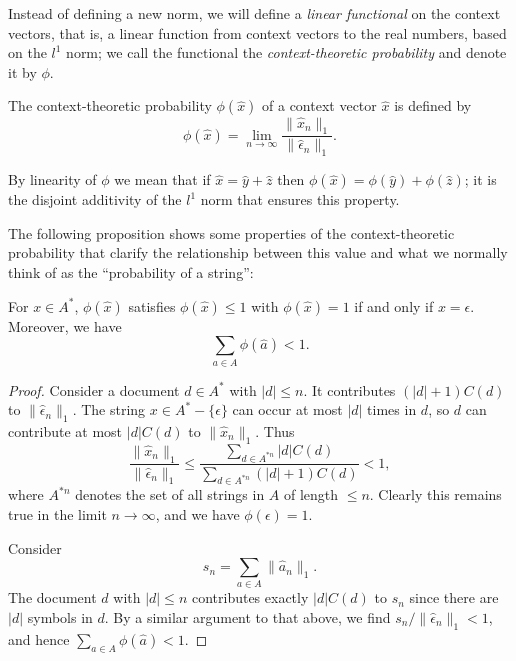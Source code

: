 \documentclass[11pt]{report}
\begin{document}
Instead of defining a new norm, we will define a \emph{linear functional} on the context vectors, that is, a linear function from context vectors to the real numbers, based on the $l^1$ norm; we call the functional the \emph{context-theoretic probability} and denote it by $\phi$.

\begin{defn}
The context-theoretic probability $\phi(\hat{x})$ of a context vector $\hat{x}$ is defined by 
$$\phi(\hat{x}) = \lim_{n\rightarrow\infty} \frac{\|\hat{x}_n\|_1}{\|\hat{\epsilon}_n\|_1}.$$ 
\end{defn}

By linearity of $\phi$ we mean that if $\hat{x} = \hat{y} + \hat{z}$ then $\phi(\hat{x}) = \phi(\hat{y}) + \phi(\hat{z})$; it is the disjoint additivity of the $l^1$ norm that ensures this property.


The following proposition shows some properties of the context-theoretic probability that clarify the relationship between this value and what we normally think of as the ``probability of a string'':

\begin{prop}
For $x \in A^*$, $\phi(\hat{x})$ satisfies $\phi(\hat{x}) \le 1$ with $\phi(\hat{x}) = 1$ if and only if $x = \epsilon$. Moreover, we have
$$\sum_{a \in A} \phi(\hat{a}) < 1.$$
\end{prop}

\begin{proof}
Consider a document $d \in A^*$ with $|d| \le n$. It contributes $(|d|+1)C(d)$ to $\|\hat{\epsilon}_n\|_1$. The string $x \in A^* - \{\epsilon\}$ can occur at most $|d|$ times in $d$, so $d$ can contribute at most $|d|C(d)$ to $\|\hat{x}_n\|_1$. Thus
$$\frac{\|\hat{x}_n\|_1}{\|\hat{\epsilon}_n\|_1} \le \frac{\sum_{d\in A^{*n}}|d|C(d)}{\sum_{d\in A^{*n}}(|d|+1)C(d)} < 1,$$
where $A^{*n}$ denotes the set of all strings in $A$ of length $\le n$. Clearly this remains true in the limit $n \rightarrow \infty$, and we have $\phi(\epsilon) = 1$.

Consider $$s_n = \sum_{a \in A} \|\hat{a}_n\|_1.$$ The document $d$ with $|d| \le n$ contributes exactly $|d|C(d)$ to $s_n$ since there are $|d|$ symbols in $d$. By a similar argument to that above, we find $s_n/\|\hat{\epsilon}_n\|_1 < 1$, and hence $\sum_{a \in A} \phi(\hat{a}) < 1$.
\end{proof}
\end{document}
